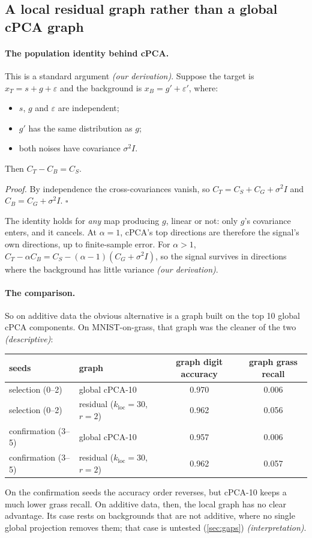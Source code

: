\documentclass[10pt]{article}
\newcommand{\cder}{\textit{\small (our derivation)}}
\newcommand{\cdesc}{\textit{\small (descriptive)}}
\newcommand{\cinterp}{\textit{\small (interpretation)}}
\newcommand{\kloc}{k_{\mathrm{loc}}}
\begin{document}
\subsection{A local residual graph rather than a global cPCA graph}
\label{sec:dec-local}

\paragraph{The population identity behind cPCA.}
\label{sec:identity}
This is a standard argument \cder. Suppose the target is $x_T = s + g + \varepsilon$ and the background is $x_B = g' + \varepsilon'$, where:
\begin{itemize}
  \item $s$, $g$ and $\varepsilon$ are independent;
  \item $g'$ has the same distribution as $g$;
  \item both noises have covariance $\sigma^2 I$.
\end{itemize}
Then $C_T - C_B = C_S$.

\emph{Proof.} By independence the cross-covariances vanish, so $C_T = C_S + C_G + \sigma^2 I$ and $C_B = C_G + \sigma^2 I$. $\square$

The identity holds for \emph{any} map producing $g$, linear or not: only $g$'s covariance enters, and it cancels. At $\alpha = 1$, cPCA's top directions are therefore the signal's own directions, up to finite-sample error. For $\alpha > 1$, $C_T - \alpha C_B = C_S - (\alpha-1)(C_G + \sigma^2 I)$, so the signal survives in directions where the background has little variance \cder.

\paragraph{The comparison.} So on additive data the obvious alternative is a graph built on the top 10 global cPCA components. On MNIST-on-grass, that graph was the cleaner of the two \cdesc:
\begin{center}
\small
\begin{tabular}{llcc}
  \toprule
  seeds & graph & graph digit accuracy & graph grass recall \\
  \midrule
  selection (0--2) & global cPCA-10 & 0.970 & 0.006 \\
  selection (0--2) & residual ($\kloc=30$, $r=2$) & 0.962 & 0.056 \\
  confirmation (3--5) & global cPCA-10 & 0.957 & 0.006 \\
  confirmation (3--5) & residual ($\kloc=30$, $r=2$) & 0.962 & 0.057 \\
  \bottomrule
\end{tabular}
\end{center}
On the confirmation seeds the accuracy order reverses, but cPCA-10 keeps a much lower grass recall. On additive data, then, the local graph has no clear advantage. Its case rests on backgrounds that are not additive, where no single global projection removes them; that case is untested (\cref{sec:gaps}) \cinterp.
\end{document}

